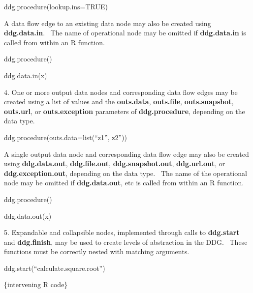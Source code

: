 \documentclass[letterpaper]{article}
\begin{document}
\bigskip

\textcolor[rgb]{0.21176471,0.37254903,0.5686275}{ddg.procedure(lookup.ins=TRUE)}


\bigskip

A data flow edge to an existing data node may also be created using \textbf{ddg.data.in}. \ The name of operational node may be omitted if \textbf{ddg.data.in }is called from within an R function.


\bigskip

\textcolor[rgb]{0.21176471,0.37254903,0.5686275}{ddg.procedure()}

\textcolor[rgb]{0.21176471,0.37254903,0.5686275}{ddg.data.in(x)}


\bigskip

4. One or more output data nodes and corresponding data flow edges may be created using a list of values and the \textbf{outs.data}, \textbf{outs.file}, \textbf{outs.snapshot}, \textbf{outs.url}, or \textbf{outs.exception} parameters of \textbf{ddg.procedure}, depending on the data type.


\bigskip

\textcolor[rgb]{0.21176471,0.37254903,0.5686275}{ddg.procedure(outs.data=list(``z1'', z2''))}


\bigskip

A single output data node and corresponding data flow edge may also be created using \textbf{ddg.data.out}, \textbf{ddg.file.out}, \textbf{ddg.snapshot.out}, \textbf{ddg.url.out}, or \textbf{ddg.exception.out}, depending on the data type. \ The name of the operational node may be omitted if \textbf{ddg.data.out}, etc is called from within an R function.


\bigskip

\textcolor[rgb]{0.21176471,0.37254903,0.5686275}{ddg.procedure()}

\textcolor[rgb]{0.21176471,0.37254903,0.5686275}{ddg.data.out(x)}


\bigskip

5. Expandable and collapsible nodes, implemented through calls to \textbf{ddg.start} and \textbf{ddg.finish}, may be used to create levels of abstraction in the DDG. \ These functions must be correctly nested with matching arguments.


\bigskip

\textcolor[rgb]{0.21176471,0.37254903,0.5686275}{ddg.start(``calculate.square.root'')}


\bigskip

\textcolor[rgb]{0.21176471,0.37254903,0.5686275}{\{intervening R code\}}
\end{document}
